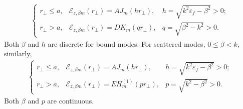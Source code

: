 \begin{align}
\left\{
 \begin{array}{lcll}
	r\!_\perp \leq a, & \mathcal{E}_{z,\beta m}(r\!_\perp )\!=\! AJ_m(h r\!_\perp), & h \!=\! 
	\sqrt{k^2\varepsilon_f-\beta^2}\! >\! 0;\\
	r\!_\perp > a, & \mathcal{E}_{z,\beta m}(r\!_\perp )\!=\!DK_m(q r\!_\perp), & q\!=\! 
	\sqrt{\beta^2-k^2}>0.
 \end{array}\right.
\end{align}
Both $ \beta $ and $ h $ are discrete for bound modes. 
For scattered modes, $ 0\leq \beta< k $, similarly, 
\begin{align}
\left\{
 \begin{array}{lcll}
	r\!_\perp \leq a, & \mathcal{E}_{z,\beta m}(r\!_\perp )\!=\! AJ_m(h r\!_\perp), & h \!=\! 
	\sqrt{k^2\varepsilon_f-\beta^2}\! >\! 0;\\
	r\!_\perp > a, & \mathcal{E}_{z,\beta m}(r\!_\perp )\!=\!EH_m^{(\!1\!)}(p r\!_\perp\!), & p\!\!=\!\! 
	\sqrt{k^2-\beta^2}>0.
 \end{array}\right.
\end{align}
Both $ \beta $ and $ p $ are continuous. 

